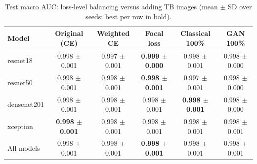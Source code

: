 \begin{table}[htbp]
\centering
\caption{Test macro AUC: loss-level balancing versus adding TB images (mean $\pm$ SD over seeds; best per row in bold).}
\label{tab:loss_macro_auc}
\begin{tabular}{lccccc}
\toprule
Model & Original (CE) & Weighted CE & Focal loss & Classical 100\% & GAN 100\% \\
\midrule
resnet18 & 0.998 $\pm$ 0.001 & 0.997 $\pm$ 0.001 & \textbf{0.999 $\pm$ 0.000} & 0.998 $\pm$ 0.001 & 0.998 $\pm$ 0.000 \\
resnet50 & 0.998 $\pm$ 0.001 & 0.998 $\pm$ 0.001 & \textbf{0.998 $\pm$ 0.001} & 0.997 $\pm$ 0.001 & 0.998 $\pm$ 0.000 \\
densenet201 & 0.998 $\pm$ 0.001 & 0.998 $\pm$ 0.001 & 0.998 $\pm$ 0.001 & \textbf{0.998 $\pm$ 0.001} & 0.998 $\pm$ 0.000 \\
xception & \textbf{0.998 $\pm$ 0.001} & 0.998 $\pm$ 0.001 & 0.998 $\pm$ 0.001 & 0.998 $\pm$ 0.001 & 0.998 $\pm$ 0.001 \\
\midrule
All models & 0.998 $\pm$ 0.001 & 0.998 $\pm$ 0.001 & \textbf{0.998 $\pm$ 0.001} & 0.998 $\pm$ 0.001 & 0.998 $\pm$ 0.001 \\
\bottomrule
\end{tabular}
\end{table}
